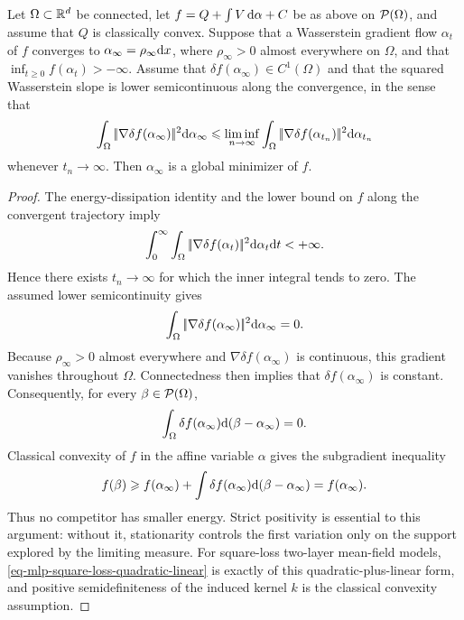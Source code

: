 \begin{prop}\label{prop-classical-convex-stationary}
	Let $\Omega\subset\mathbb{R}^d$ be connected, let $f=Q+\int V\,\mathrm{d}\alpha+C$ be as above on $\mathcal{P}(\Omega)$, and assume that $Q$ is classically convex. Suppose that a Wasserstein gradient flow $\alpha_t$ of $f$ converges to $\alpha_\infty=\rho_\infty\mathrm{d} x$, where $\rho_\infty>0$ almost everywhere on $\Omega$, and that $\inf_{t\geq0}f(\alpha_t)>-\infty$. Assume that $\delta f(\alpha_\infty)\in C^1(\Omega)$ and that the squared Wasserstein slope is lower semicontinuous along the convergence, in the sense that
	\[
		\int_\Omega|\!| \nabla\delta f(\alpha_\infty) |\!|^2\mathrm{d}\alpha_\infty
		\leqslant
		\liminf_{n\to\infty}
		\int_\Omega|\!| \nabla\delta f(\alpha_{t_n}) |\!|^2\mathrm{d}\alpha_{t_n}
	\]
	whenever $t_n\to\infty$. Then $\alpha_\infty$ is a global minimizer of $f$.
\end{prop}
\begin{proof}
	The energy-dissipation identity and the lower bound on $f$ along the convergent trajectory imply
	\[
		\int_0^\infty
		\int_\Omega|\!| \nabla\delta f(\alpha_t) |\!|^2\mathrm{d}\alpha_t\mathrm{d} t
		<+\infty.
	\]
	Hence there exists $t_n\to\infty$ for which the inner integral tends to zero. The assumed lower semicontinuity gives
	\[
		\int_\Omega |\!| \nabla \delta f(\alpha_\infty) |\!|^2\mathrm{d}\alpha_\infty=0.
	\]
	Because $\rho_\infty>0$ almost everywhere and $\nabla\delta f(\alpha_\infty)$ is continuous, this gradient vanishes throughout $\Omega$. Connectedness then implies that $\delta f(\alpha_\infty)$ is constant. Consequently, for every $\beta\in\mathcal{P}(\Omega)$,
	\[
		\int_\Omega\delta f(\alpha_\infty)\mathrm{d}(\beta-\alpha_\infty)=0.
	\]
	Classical convexity of $f$ in the affine variable $\alpha$ gives the subgradient inequality
	\[
		f(\beta)\geqslant f(\alpha_\infty)
		+
		\int \delta f(\alpha_\infty)\mathrm{d}(\beta-\alpha_\infty)
		= f(\alpha_\infty).
	\]
	Thus no competitor has smaller energy. Strict positivity is essential to this argument: without it, stationarity controls the first variation only on the support explored by the limiting measure. For square-loss two-layer mean-field models, \eqref{eq-mlp-square-loss-quadratic-linear} is exactly of this quadratic-plus-linear form, and positive semidefiniteness of the induced kernel $k$ is the classical convexity assumption.
\end{proof}

